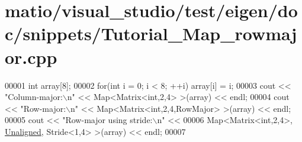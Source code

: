 \hypertarget{matio_2visual__studio_2test_2eigen_2doc_2snippets_2_tutorial___map__rowmajor_8cpp_source}{}\section{matio/visual\+\_\+studio/test/eigen/doc/snippets/\+Tutorial\+\_\+\+Map\+\_\+rowmajor.cpp}
\label{matio_2visual__studio_2test_2eigen_2doc_2snippets_2_tutorial___map__rowmajor_8cpp_source}

\begin{DoxyCode}
00001 \textcolor{keywordtype}{int} array[8];
00002 \textcolor{keywordflow}{for}(\textcolor{keywordtype}{int} i = 0; i < 8; ++i) array[i] = i;
00003 cout << \textcolor{stringliteral}{"Column-major:\(\backslash\)n"} << Map<Matrix<int,2,4> >(array) << endl;
00004 cout << \textcolor{stringliteral}{"Row-major:\(\backslash\)n"} << Map<Matrix<int,2,4,RowMajor> >(array) << endl;
00005 cout << \textcolor{stringliteral}{"Row-major using stride:\(\backslash\)n"} <<
00006   Map<Matrix<int,2,4>, \hyperlink{group__enums_gga45fe06e29902b7a2773de05ba27b47a1ac935220b4c844108e183ebe30a4d5204}{Unaligned}, Stride<1,4> >(array) << endl;
00007 
\end{DoxyCode}
